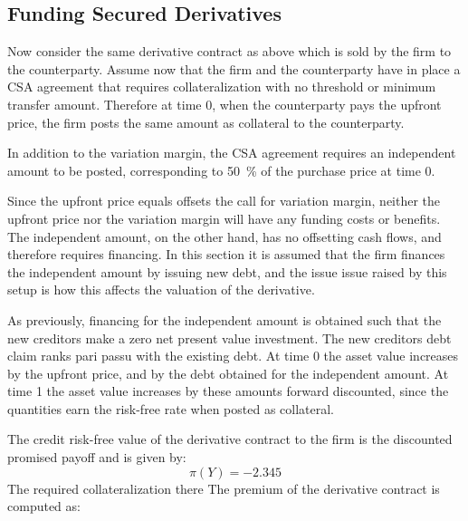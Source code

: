 \documentclass[../main.tex]{subfiles}
\begin{document}
    \subsection{Funding Secured Derivatives}
    \label{sec:example-secured-derivative}
        Now consider the same derivative contract as above which is sold by the firm to the counterparty.
        Assume now that the firm and the counterparty have in place a CSA agreement
        that requires collateralization with no threshold or minimum transfer amount.
        Therefore at time 0, when the counterparty pays the upfront price,
        the firm posts the same amount as collateral to the counterparty.

        In addition to the variation margin, 
        the CSA agreement requires an independent amount to be posted,
        corresponding to \qty[round-precision=0]{50}{\percent} of the purchase price at time 0.

        Since the upfront price equals offsets the call for variation margin,
        neither the upfront price nor the variation margin will have any funding costs or benefits.
        The independent amount, on the other hand, has no offsetting cash flows, 
        and therefore requires financing.
        In this section it is assumed that the firm finances the independent amount by issuing new debt,
        and the issue issue raised by this setup is how this affects the valuation of the derivative.
        

        As previously, financing for the independent amount is obtained 
        such that the new creditors make a zero net present value investment.
        The new creditors debt claim ranks pari passu with the existing debt.
        At time 0 the asset value increases by the upfront price,
        and by the debt obtained for the independent amount.
        At time 1 the asset value increases by these amounts forward discounted,
        since the quantities earn the risk-free rate when posted as collateral.

        The credit risk-free value of the derivative contract to the firm 
        is the discounted promised payoff and is given by:
        \begin{equation}
            \pi(Y) = \num{-2.345}
        \end{equation}
        The required collateralization there
        The premium of the derivative contract is computed as:
\end{document}
